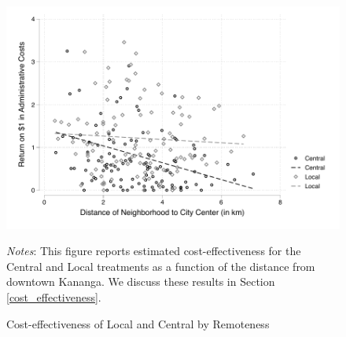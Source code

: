 \documentclass[12pt,english]{article}
\renewcommand{\footnotesize}{\fontsize{9pt}{11pt}\selectfont}\usepackage[unicode=true,
\begin{document}

\begin{figure}[H]
\centering{}\caption{Cost-effectiveness of Local and Central by Remoteness \label{cea_remoteness}}
\includegraphics[scale=.8]{Output/scatter_benefit_cost_dist_center_CvsL.pdf}
\parbox{6in}{\footnotesize \textit{Notes}: This figure reports estimated cost-effectiveness for the Central and Local treatments as a function of the distance from downtown Kananga. We discuss these results in Section \ref{cost_effectiveness}.}
\end{figure}

\end{document}
